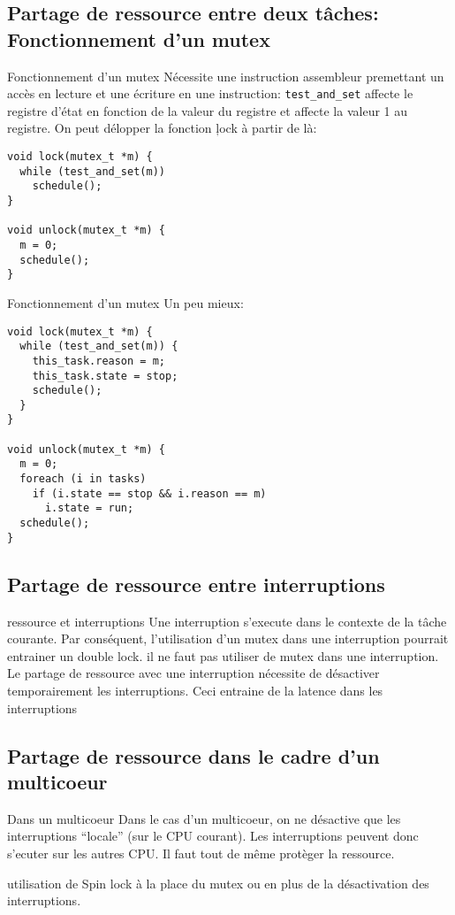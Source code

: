 \subsection{Partage de ressource entre deux tâches: Fonctionnement d'un mutex}

\begin{frame}[fragile]{Fonctionnement d'un mutex}
  Nécessite une instruction assembleur  premettant un accès en lecture
  et une écriture  en une instruction: \texttt{test\_and\_set} affecte
  le registre d'état  en fonction de la valeur  du registre et affecte
  la valeur  1 au  registre. On peut  délopper la fonction  \c{lock} à
  partir de là:
\begin{lstlisting} 
void lock(mutex_t *m) {
  while (test_and_set(m))
    schedule();
}

void unlock(mutex_t *m) {
  m = 0;
  schedule();
}
\end{lstlisting} 
\end{frame}

\begin{frame}[fragile]{Fonctionnement d'un mutex}
  Un peu mieux:
  \begin{lstlisting} 
void lock(mutex_t *m) {
  while (test_and_set(m)) {
    this_task.reason = m;
    this_task.state = stop;
    schedule();
  }
}

void unlock(mutex_t *m) {
  m = 0;
  foreach (i in tasks)
    if (i.state == stop && i.reason == m)
      i.state = run;
  schedule();
}
  \end{lstlisting}
\end{frame} 

\subsection{Partage de ressource entre interruptions}
\begin{frame}{ressource et interruptions}
Une interruption s'execute dans le contexte de la tâche courante.
Par conséquent, l'utilisation d'un mutex dans une interruption pourrait entrainer un double lock. 
il ne faut pas utiliser de mutex dans une interruption.
Le partage de ressource avec une interruption nécessite de désactiver temporairement les interruptions.
Ceci entraine de la latence dans les interruptions
\end{frame} 

\subsection{Partage de ressource dans le cadre d'un multicoeur}
\begin{frame}{Dans un multicoeur}
Dans le cas d'un multicoeur, on ne désactive que les interruptions ``locale'' (sur le CPU courant).
Les interruptions peuvent donc s'ecuter sur les autres CPU.
Il faut tout de même protèger la ressource. 


utilisation de Spin lock à la place du mutex ou en plus de la désactivation des interruptions. 

\end{frame} 

